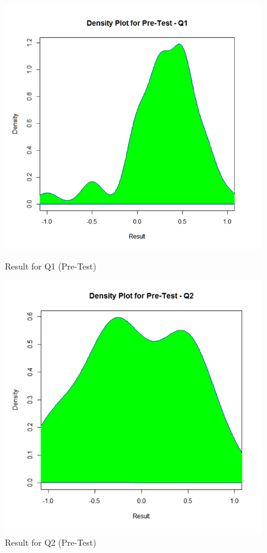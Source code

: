 \begin{figure}
	\centering
	\begin{minipage}{.5\textwidth}
		\centering
		\includegraphics[width=1\linewidth]{figures/Pretest_q1}
		\caption{Result for Q1 (Pre-Test)}
		\label{fig:Pretest_q1}
	\end{minipage}%
	\begin{minipage}{.5\textwidth}
		\centering
		\includegraphics[width=1\linewidth]{figures/Pretest_q2}
		\caption{Result for Q2 (Pre-Test)}
		\label{fig:Pretest_q2}
	\end{minipage}
\end{figure}

